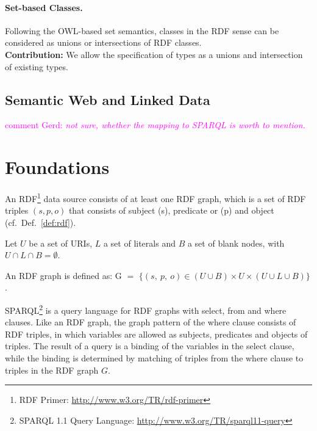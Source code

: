 \documentclass{llncs} %
\newcommand{\ggr}[1]{\textcolor{magenta}{comment Gerd: \textit{#1}}}
\begin{document}
\paragraph*{\bf Set-based Classes.}
Following the OWL-based set semantics, classes in the RDF sense can be considered as
unions or intersections of RDF classes. \\
\textbf{Contribution:} We allow the specification of types as a unions and intersection of existing types. \\


\subsection{Semantic Web and Linked Data}

\ggr{not sure, whether the mapping to SPARQL is worth to mention.}



\section{Foundations}


An RDF\footnote{RDF Primer: \url{http://www.w3.org/TR/rdf-primer}} data source consists of at least one RDF graph, which is a set of RDF triples $(s, p, o)$
that consists of subject (s), predicate or (p)  and object (cf.~Def.~\ref{def:rdf}).

\begin{definition}
\label{def:rdf}
Let $U$ be a set of URIs, $L$  a set of literals and $B$ a set of blank nodes,
with $U \cap L \cap B = \emptyset$.

An RDF graph is defined as:
$\mathrm{G}$ $=$ $\{ (s ,\ p , \ o) \in (U\cup B)\times U \times (U\cup L \cup B) \} $. 
\end{definition}


SPARQL\footnote{SPARQL 1.1 Query Language: \url{http://www.w3.org/TR/sparql11-query}} 
is a query language for RDF graphs with  \textsf{select}, \textsf{from} and \textsf{where} clauses.
Like an RDF graph, the graph pattern of the \textsf{where} clause consists of RDF triples, in which
variables are allowed as subjects, predicates and objects of triples.
The result of a query is a binding of the variables in the \textsf{select} clause,
while the binding is determined by matching of triples from the \textsf{where} clause
to triples in the RDF graph $G$.
\end{document}
